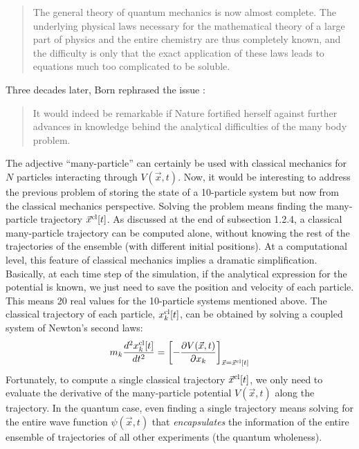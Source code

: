 \documentclass[nofootinbib, secnumarabic, amsmath, nobibnotes,10pt,aps,pra]{revtex4-1}
\begin{document}
\begin{quote}
The general theory of quantum mechanics is now almost complete. The underlying physical laws necessary for the mathematical theory of a large part of physics and the entire chemistry are thus completely known, and the difficulty is only that the exact application of these laws leads to equations much too complicated to be soluble.\vspace*{-6pt}\\
\end{quote}

Three decades later, Born rephrased the issue \cite{om.born1960bis}:\\\vspace*{-6pt}

\begin{quote}
It would indeed be remarkable if Nature fortified herself against further advances in knowledge behind the analytical difficulties of the many body problem.\vspace*{-6pt}\\
\end{quote}

The adjective ``many-particle'' can certainly be used with classical
mechanics for $N$ particles interacting through $V(\vec{x},t)$. Now,
it would be interesting to address the previous problem of storing
the state of a 10-particle system but now from the classical
mechanics perspective. Solving the problem means finding the
many-particle trajectory $\vec x^{\rm cl}[t]$. As discussed at the
end of subsection 1.2.4, a classical many-particle trajectory can be
computed alone, without knowing the rest of the trajectories of the
ensemble (with different initial positions). At a computational
level, this feature of classical mechanics implies a dramatic
simplification. Basically, at each time step of the simulation, if
the analytical expression for the potential is known, we just need
to save the position and velocity of each particle. This means 20
real values for the 10-particle systems mentioned above. The
classical trajectory of each particle, $x^{\rm cl}_k[t]$, can be
obtained by solving a coupled system of Newton's  second laws:
\begin{equation}\label{om.NewtonMP}
m_k\frac{d^2 x^{\rm cl}_k[t]} {dt^2} = \left [-\frac{\partial V(\vec{x},t)}{\partial x_k} \right ]_{\vec x = \vec x^{\rm cl}[t]}
\end{equation}
Fortunately, to compute a single classical trajectory $\vec x^{\rm
cl}[t]$, we only need to evaluate the derivative of the
many-particle potential $V(\vec{x},t)$ along the trajectory. In the
quantum case, even finding a single trajectory means solving for the
entire wave function $\psi(\vec{x},t)$ that \emph{encapsulates} the information
of the entire ensemble of trajectories of all other experiments (the quantum wholeness). 
\end{document}
